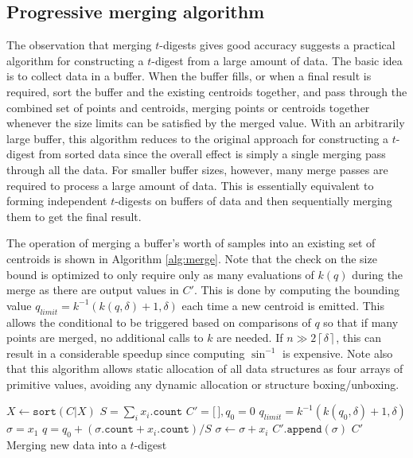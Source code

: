 \documentclass[11pt]{amsart}
\begin{document}
\subsection{Progressive merging algorithm}
The observation that merging $t$-digests gives good accuracy suggests a practical algorithm for constructing a $t$-digest from a large amount of data. The basic idea is to collect data in a buffer. When the buffer fills, or when a final result is required, sort the buffer and the existing centroids together, and pass through the combined set of points and centroids, merging points or centroids together whenever the size limits can be satisfied by the merged value. With an arbitrarily large buffer, this algorithm reduces to the original approach for constructing a $t$-digest from sorted data since the overall effect is simply a single merging pass through all the data. For smaller buffer sizes, however, many merge passes are required to process a large amount of data. This is essentially equivalent to forming independent $t$-digests on buffers of data and then sequentially merging them to get the final result.

The operation of merging a buffer's worth of samples into an existing set of centroids is shown in Algorithm \ref{alg:merge}. Note that the check on the size bound is optimized to only require only as many evaluations of $k(q)$ during the merge as there are output values in $C'$. This is done by computing the bounding value $q_{limit} = k^{-1}(k(q, \delta) + 1, \delta)$ each time a new centroid is emitted. This allows the conditional to be triggered based on comparisons of $q$ so that if many points are merged, no additional calls to $k$ are needed. If $n \gg 2 \left \lceil \delta \right \rceil$, this can result in a considerable speedup since computing $\sin^{-1}$ is expensive. Note also that this algorithm allows static allocation of all data structures as four arrays of primitive values, avoiding any dynamic allocation or structure boxing/unboxing.
\begin{algorithm}[ht]
 \label{alg:merge}
\SetNoFillComment
{}
$X \gets \mathtt{sort}(C | X)$\;
$ S = \sum_i x_i.\mathtt{count}$\;
$C' = \lbrack \, \rbrack, q_0 = 0$\;
$q_{limit}=k^{-1}(k(q_0, \delta)+1, \delta)$\;
$\sigma = x_1$\;
 {
  $q = q_0 + (\sigma.\mathtt{count} + x_i.\mathtt{count})/S$\;
   {
      $\sigma \gets \sigma + x_i$\;
  } 
} 
$C'\mathtt{.append}(\sigma)$\;
\Return $ C' $\\
\caption{Merging new data into a $t$-digest}
\end{algorithm}
\end{document}

